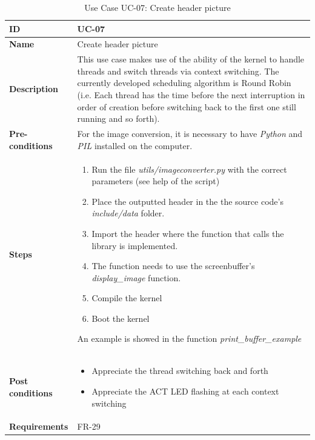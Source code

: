 \begin{table}[H]
    \centering
    \begin{tabular}{| p{3cm} | p{7cm} |}
    \hline
    \textbf{ID}             & UC-07 \\ \hline
    \textbf{Name}           & Create header picture\\ \hline
    \textbf{Description}    & This use case makes use of the ability of the kernel to handle threads and switch threads via context switching. The currently developed scheduling algorithm is Round Robin (i.e. Each thread has the time before the next interruption in order of creation before switching back to the first one still running and so forth).
	\\ \hline
    \textbf{Pre-conditions} & For the image conversion, it is necessary to have \textit{Python} and \textit{PIL} installed on the computer. \\ \hline
    \textbf{Steps}          &   \begin{enumerate}
                                    \item Run the file \textit{utils/imageconverter.py} with the correct parameters (see help of the script)
                                    \item Place the outputted header in the the source code's \textit{include/data} folder.
                                    \item Import the header where the function that calls the library is implemented.
                                    \item The function needs to use the screenbuffer's \textit{display\_image} function.
                                    \item Compile the kernel
                                    \item Boot the kernel
                                \end{enumerate}
                                An example is showed in the function \textit{print\_buffer\_example}
 \\ \hline
    \textbf{Post conditions} & 	\begin{itemize}
    									\item Appreciate the thread switching back and forth
    									\item Appreciate the ACT LED flashing at each context switching
    							   	\end{itemize}
    							   	\\ \hline
    \textbf{Requirements}       &  FR-29 \\ \hline
    \end{tabular}
    \caption{Use Case UC-07: Create header picture}
\end{table}



